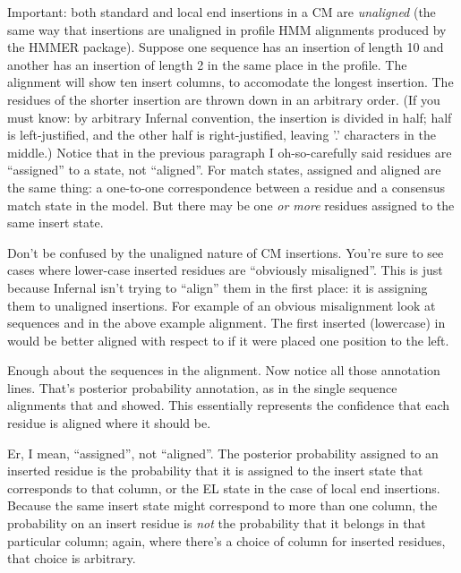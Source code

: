 Important: both standard and local end insertions in a CM are
\emph{unaligned} (the same way that insertions are unaligned in
profile HMM alignments produced by the HMMER package). Suppose one
sequence has an insertion of length 10 and another has an insertion of
length 2 in the same place in the profile. The alignment will show ten
insert columns, to accomodate the longest insertion.  The residues of
the shorter insertion are thrown down in an arbitrary order. (If you
must know: by arbitrary Infernal convention, the insertion is divided
in half; half is left-justified, and the other half is
right-justified, leaving '.' characters in the middle.)  Notice that
in the previous paragraph I oh-so-carefully said residues are
``assigned'' to a state, not ``aligned''. For match states, assigned
and aligned are the same thing: a one-to-one correspondence between a
residue and a consensus match state in the model. But there may be one
\emph{or more} residues assigned to the same insert state.

Don't be confused by the unaligned nature of CM insertions. You're
sure to see cases where lower-case inserted residues are ``obviously
misaligned''. This is just because Infernal isn't trying to ``align''
them in the first place: it is assigning them to unaligned
insertions. For example of an obvious misalignment look at sequences
 and  in the above example
alignment. The first inserted (lowercase)  in
 would be better aligned with respect to
 if it were placed one position to the left.

Enough about the sequences in the alignment. Now notice all those
 annotation lines. That's posterior probability annotation,
as in the single sequence alignments that  and
 showed. This essentially represents the confidence
that each residue is aligned where it should be. 

Er, I mean, ``assigned'', not ``aligned''. The posterior probability
assigned to an inserted residue is the probability that it is assigned
to the insert state that corresponds to that column, or the EL state
in the case of local end insertions. Because the same insert state
might correspond to more than one column, the probability on an insert
residue is \emph{not} the probability that it belongs in that
particular column; again, where there's a choice of column for
inserted residues, that choice is arbitrary. 

